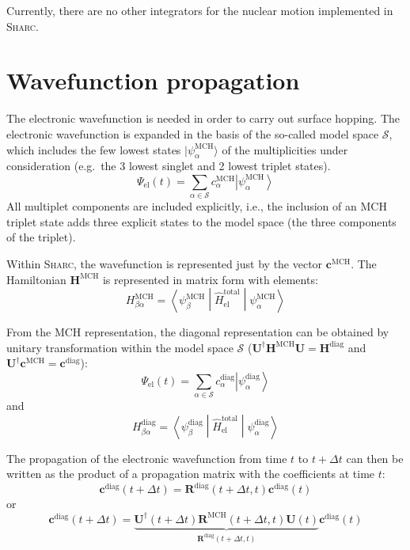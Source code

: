 \documentclass[a4paper,11pt,DIV=15,openany,twoside=false]{scrbook}
\newcommand{\sharc}{\textsc{Sharc}}
\newcommand{\VEC}[1]{\ensuremath{\mathbf{#1}}}
\begin{document}
Currently, there are no other integrators for the nuclear motion implemented in \sharc.


\section{Wavefunction propagation}\label{met:propagate}

The electronic wavefunction is needed in order to carry out surface hopping. The electronic wavefunction is expanded in the basis of the so-called model space $\mathcal{S}$, which includes the few lowest states $|\psi^{\text{MCH}}_\alpha\rangle$ of the multiplicities under consideration (e.g.\ the 3 lowest singlet and 2 lowest triplet states). 
\begin{equation}
  \Psi_{\text{el}}(t)=\sum\limits_{\alpha\in\mathcal{S}} c^{\text{MCH}}_\alpha \left|\psi^{\text{MCH}}_\alpha\right\rangle
\end{equation}
All multiplet components are included explicitly, i.e., the inclusion of an MCH triplet state adds three explicit states to the model space (the three components of the triplet).

Within \sharc, the wavefunction is represented just by the vector $\VEC{c}^{\text{MCH}}$. The Hamiltonian $\VEC{H}^{\text{MCH}}$ is represented in matrix form with elements:
\begin{equation}
  H^{\text{MCH}}_{\beta\alpha}=\left\langle\psi^{\text{MCH}}_\beta\middle|\hat{H}_{\text{el}}^{\text{total}}\middle|\psi^{\text{MCH}}_\alpha\right\rangle
\end{equation}

From the MCH representation, the diagonal representation can be obtained by unitary transformation within the model space $\mathcal{S}$ ($\VEC{U}^\dagger\VEC{H}^{\text{MCH}}\VEC{U}=\VEC{H}^{\text{diag}}$ and $\VEC{U}^\dagger\VEC{c}^{\text{MCH}}=\VEC{c}^{\text{diag}}$):
\begin{equation}
  \Psi_{\text{el}}(t)=\sum\limits_{\alpha\in\mathcal{S}} c^{\text{diag}}_\alpha \left|\psi^{\text{diag}}_\alpha\right\rangle
\end{equation}
and
\begin{equation}
  H^{\text{diag}}_{\beta\alpha}=\left\langle\psi^{\text{diag}}_\beta\middle|\hat{H}_{\text{el}}^{\text{total}}\middle|\psi^{\text{diag}}_\alpha\right\rangle
\end{equation}

The propagation of the electronic wavefunction from time $t$ to $t+\Delta t$ can then be written as the product of a propagation matrix with the coefficients at time $t$:
\begin{equation}
  \VEC{c}^{\text{diag}}(t+\Delta t)=\VEC{R}^{\text{diag}}(t+\Delta t,t)\VEC{c}^{\text{diag}}(t)
\end{equation}
or
\begin{equation}
  \VEC{c}^{\text{diag}}(t+\Delta t)=\underbrace{\VEC{U}^\dagger(t+\Delta t)\VEC{R}^{\text{MCH}}(t+\Delta t,t)\VEC{U}(t)}_{\VEC{R}^{\text{diag}}(t+\Delta t,t)}\VEC{c}^{\text{diag}}(t)
\end{equation}
\end{document}
